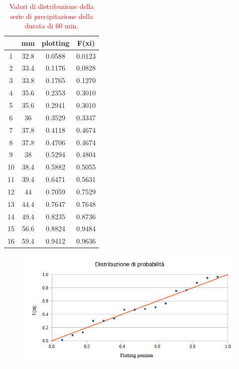 \begin{table}[H] \centering
    \caption{\textcolor{red}{Valori di distribuzione della serie di precipitazione della durata di 60 min.}}
            \begin{tabular}{cccc}
            \toprule
               & mm   & plotting & F(xi)  \\
            \midrule
            1  & 32.8 & 0.0588   & 0.0123 \\
            2  & 33.4 & 0.1176   & 0.0828 \\
            3  & 33.8 & 0.1765   & 0.1270 \\
            4  & 35.6 & 0.2353   & 0.3010 \\
            5  & 35.6 & 0.2941   & 0.3010 \\
            6  & 36   & 0.3529   & 0.3347 \\
            7  & 37.8 & 0.4118   & 0.4674 \\
            8  & 37.8 & 0.4706   & 0.4674 \\
            9  & 38   & 0.5294   & 0.4804 \\
            10 & 38.4 & 0.5882   & 0.5055 \\
            11 & 39.4 & 0.6471   & 0.5631 \\
            12 & 44   & 0.7059   & 0.7529 \\
            13 & 44.4 & 0.7647   & 0.7648 \\
            14 & 49.4 & 0.8235   & 0.8736 \\
            15 & 56.6 & 0.8824   & 0.9484 \\
            16 & 59.4 & 0.9412   & 0.9636 \\
            \bottomrule
            \end{tabular}
\end{table}

\begin{figure}[H]\centering
    \includegraphics[scale=0.75]{immagini/distr_prob_60min.png}
\end{figure}

